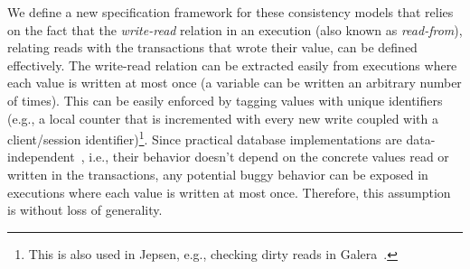 
We define a new specification framework for these consistency models that relies on the fact that the \emph{write-read} relation in an execution (also known as \emph{read-from}), relating reads with the transactions that wrote their value, can be defined effectively. The write-read relation can be extracted easily from executions where each value is written at most once (a variable can be written an arbitrary number of times). This can be easily enforced by tagging values with unique identifiers (e.g., a local counter that is incremented with every new write coupled with a client/session identifier)\footnote{This is also used in Jepsen, e.g., checking dirty reads in Galera~\cite{jepsen-galera}.}. Since practical database implementations are data-independent~\cite{DBLP:conf/popl/Wolper86}, i.e., their behavior doesn't depend on the concrete values read or written in the transactions, any potential buggy behavior can be exposed in executions where each value is written at most once. Therefore, this assumption is without loss of generality.

